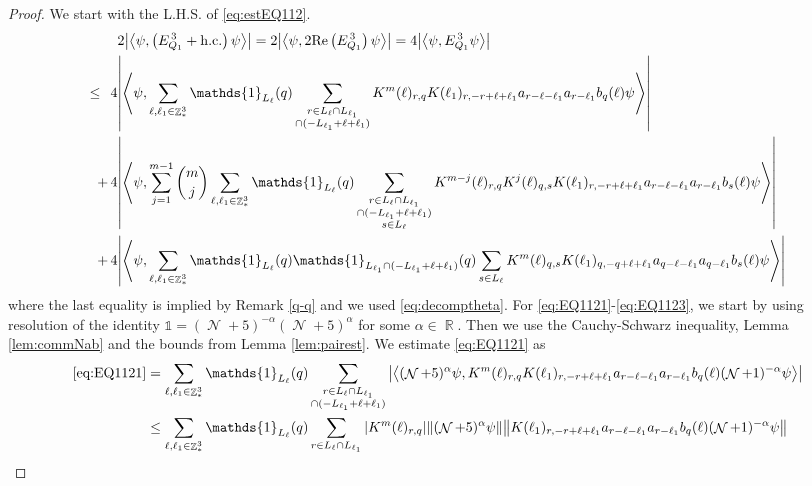 \documentclass[sn-mathphys, Numbered ,a4paper]{sn-jnl}%
\DeclareMathOperator{\R}{\mathbb{R}}
\DeclareMathOperator{\Z}{\mathbb{Z}}
\DeclareMathOperator{\NN}{\mathcal{N}}
\newcommand{\eva}[1]{\left\langle #1 \right\rangle}
\theoremstyle{plain}
\theoremstyle{definition}
\theoremstyle{remark}
\theoremstyle{plain}
\theoremstyle{definition}
\theoremstyle{remark}
\begin{document}
\begin{proof}
We start with the L.H.S. of \eqref{eq:estEQ112}.
\begin{align}
	&2\abs{\eva{\psi,\left(E^{\,3}_{Q_1}+\mathrm{h.c.}\right) \psi }} = 2\abs{\eva{\psi,2\mathrm{Re}\left(E^{\,3}_{Q_1}\right) \psi }} = 4\abs{\eva{\psi, E^{\,3}_{Q_1} \psi }}\nonumber\\
	\leq\,\;4&\abs{\eva{\psi, \sum\limits_{\ell, \ell_1\in \Z^3_*} \mathds{1}_{L_{\ell}}(q) \sum\limits_{\substack{r\in L_{\ell} \cap L_{\ell_1}\\ \cap (-L_{\ell_1}+\ell+\ell_1)}}  K^m(\ell )_{r,q} K(\ell_1)_{r,-r+\ell+\ell_1} a_{r-\ell-\ell_1} a_{r-\ell_1} b_{q}(\ell) \psi }}\label{eq:EQ1121}\\
	+\,4&   \abs{\eva{\psi, \sum\limits_{j=1}^{m-1} {{m}\choose j} \sum\limits_{\ell, \ell_1\in \Z^3_*}\mathds{1}_{L_{\ell}}(q) \sum\limits_{\substack{r\in L_{\ell} \cap L_{\ell_1}\\ \cap (-L_{\ell_1}+\ell+\ell_1)\\ s \in L_{\ell}}} K^{m-j}(\ell)_{r,q} K^{j}(\ell)_{q,s}K(\ell_1)_{r,-r+\ell+\ell_1} a_{r-\ell-\ell_1} a_{r-\ell_1} b_{s}(\ell) \psi }}\label{eq:EQ1122}\\
	+\,4&\abs{\eva{\psi, \sum\limits_{\ell, \ell_1\in \Z^3_*} \mathds{1}_{L_{\ell}}(q) \mathds{1}_{L_{\ell_1}\cap(-L_{\ell_1}+\ell+\ell_1)}(q) \sum\limits_{s \in L_{\ell}}  K^m(\ell)_{q,s} K(\ell_1)_{q,-q+\ell+\ell_1} a_{q-\ell-\ell_1} a_{q-\ell_1} b_{s}(\ell) \psi }}\label{eq:EQ1123}
\end{align}
where the last equality is implied by Remark \ref{q-q} and we used \eqref{eq:decomptheta}.
For \eqref{eq:EQ1121}-\eqref{eq:EQ1123}, we start by using resolution of the identity $\mathds{1} = (\NN+5)^{-\alpha}(\NN+5)^{\alpha}$ for some $\alpha \in \R$. Then we use the Cauchy-Schwarz inequality, Lemma \ref{lem:commNab} and the bounds from Lemma \ref{lem:pairest}. 
We estimate \eqref{eq:EQ1121} as 
\begin{align}
	 \eqref{eq:EQ1121}
	 &=\sum\limits_{\ell, \ell_1\in \Z^3_*} \mathds{1}_{L_{\ell}}(q) \sum\limits_{\substack{r\in L_{\ell} \cap L_{\ell_1}\\ \cap (-L_{\ell_1}+\ell+\ell_1)}} \abs{\eva{  (\NN+5)^{\alpha} \psi, K^m(\ell )_{r,q} K(\ell_1)_{r,-r+\ell+\ell_1} a_{r-\ell-\ell_1} a_{r-\ell_1} b_{q}(\ell)  (\NN+1)^{-\alpha} \psi }}\nonumber\\
	 &\leq \sum\limits_{\ell, \ell_1\in \Z^3_*} \mathds{1}_{L_{\ell}}(q) \sum\limits_{r\in L_{\ell} \cap L_{\ell_1}} \abs{K^m(\ell )_{r,q}} \norm{(\NN+5)^{\alpha} \psi} \norm{  K(\ell_1)_{r,-r+\ell+\ell_1} a_{r-\ell-\ell_1} a_{r-\ell_1} b_{q}(\ell) (\NN+1)^{-\alpha} \psi }\nonumber\\

\end{align}
\end{proof}
\end{document}
